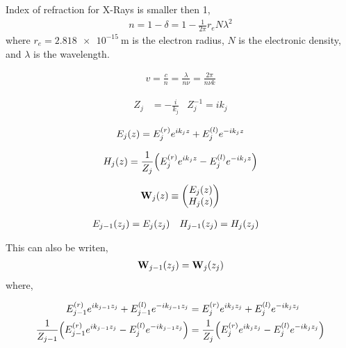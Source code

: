 \newpage
Index of refraction for X-Rays is smaller then 1,
\begin{align*}
	n = 1 - \delta = 1 - \frac{1}{2\pi}r_e N \lambda^2
\end{align*} where $r_e = \SI{2.818e-15}{\meter}$ is the electron radius, $N$ is the electronic density, and $\lambda$ is the wavelength.

\begin{align*}
	v = \frac{c}{n} = \frac{\lambda}{n\nu} = \frac{2\pi}{n\nu k}
\end{align*}

\begin{align*}
	Z_j &= -\frac{i}{k_j} & Z_j^{-1} = ik_j
\end{align*}



\begin{align*}
	E_j\pqty{z} = E^{(r)}_{j}e^{ik_jz} + E^{(l)}_{j}e^{-ik_jz}
\end{align*}

\begin{align*}
	H_j\pqty{z} = \frac{1}{Z_j}\pqty{E^{(r)}_{j}e^{ik_jz} - E^{(l)}_{j}e^{-ik_jz}}
\end{align*}

\begin{align*}
	\vb{W}_j\pqty{z} \equiv \pmqty{E_j\pqty{z} \\ H_j\pqty{z}}
\end{align*}

\begin{align*}
	E_{j-1}\pqty{z_j} &= E_{j}\pqty{z_j} & H_{j-1}\pqty{z_j} &= H_{j}\pqty{z_j}
\end{align*}

This can also be writen,
\begin{align*}
	\vb{W}_{j-1}\pqty{z_j} = \vb{W}_{j}\pqty{z_j}
\end{align*} where,

\begin{align*}
	E^{(r)}_{j-1}e^{ik_{j-1}z_j} + E^{(l)}_{j-1}e^{-ik_{j-1}z_j} &= E^{(r)}_{j}e^{ik_{j}z_j} + E^{(l)}_{j}e^{-ik_{j}z_j} \\
	\frac{1}{Z_{j-1}}\pqty{E^{(r)}_{j-1}e^{ik_{j-1}z_j} - E^{(l)}_{j}e^{-ik_{j-1}z_j}} &= \frac{1}{Z_{j}}\pqty{E^{(r)}_{j}e^{ik_{j}z_j} - E^{(l)}_{j}e^{-ik_{j}z_j}}
\end{align*}


